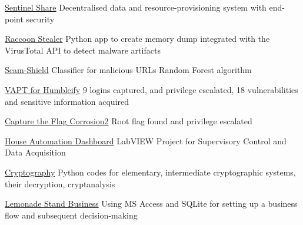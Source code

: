 \vspace{-4.0mm} 
\begin{cvskills}


\cvskill
    {\href{https://github.com/asr-24/SentinelShare}{Sentinel Share}} %
    {Decentralised data and resource-provisioning system with end-point security} %

\cvskill
    {\href{https://github.com/asr-24/RaccoonStealer}{Raccoon Stealer}} %
    {Python app to create memory dump integrated with the VirusTotal API to detect malware artifacts} %

\cvskill
    {\href{https://github.com/asr-24/ScamShield}{Scam-Shield}} %
    {Classifier for malicious URLs Random Forest algorithm} %

\cvskill
    {\href{https://github.com/asr-24/Humbleify_VAPTReport}{VAPT for Humbleify}} %
    {9 logins captured, and  privilege escalated, 18 vulnerabilities and sensitive information acquired} %

\cvskill
    {\href{https://github.com/asr-24/CTF-Corrosion2}{Capture the Flag Corrosion2}} %
    {Root flag found and privilege escalated} %

\cvskill
    {\href{https://github.com/asr-24/HouseAutomationSystem}{House Automation Dashboard}} %
    {LabVIEW Project for Supervisory Control and Data Acquisition} %

\cvskill
    {\href{https://github.com/asr-24/Cryptography1}{Cryptography}} %
    {Python codes for elementary, intermediate cryptographic systems, their decryption, cryptanalysis} %

\cvskill
    {\href{https://github.com/asr-24/LemonadeStandCaseStudy}{Lemonade Stand Business}} %
    {Using MS Access and SQLite for setting up a business flow and subsequent decision-making} %


\vspace{-3.0mm} 
\end{cvskills}